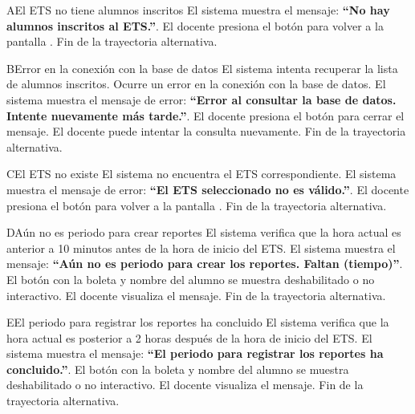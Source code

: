 \begin{UCtrayectoriaA}{A}{El ETS no tiene alumnos inscritos}
	\UCpaso El sistema muestra el mensaje: \textbf{ ``No hay alumnos inscritos al ETS.''}.
	\UCpaso[\UCactor] El docente presiona el botón  para volver a la pantalla .
	\UCpaso Fin de la trayectoria alternativa.
\end{UCtrayectoriaA}
\begin{UCtrayectoriaA}{B}{Error en la conexión con la base de datos}
	\UCpaso El sistema intenta recuperar la lista de alumnos inscritos.
	\UCpaso Ocurre un error en la conexión con la base de datos.
	\UCpaso El sistema muestra el mensaje de error: \textbf{ ``Error al consultar la base de datos. Intente nuevamente más tarde.''}.
	\UCpaso[\UCactor] El docente presiona el botón  para cerrar el mensaje.
	\UCpaso[\UCactor] El docente puede intentar la consulta nuevamente.
	\UCpaso Fin de la trayectoria alternativa.
\end{UCtrayectoriaA}
\begin{UCtrayectoriaA}{C}{El ETS no existe}
	\UCpaso El sistema no encuentra el ETS correspondiente.
	\UCpaso El sistema muestra el mensaje de error: \textbf{ ``El ETS seleccionado no es válido.''}.
	\UCpaso[\UCactor] El docente presiona el botón  para volver a la pantalla .
	\UCpaso Fin de la trayectoria alternativa.
\end{UCtrayectoriaA}
\begin{UCtrayectoriaA}{D}{Aún no es periodo para crear reportes}
	\UCpaso El sistema verifica que la hora actual es anterior a 10 minutos antes de la hora de inicio del ETS.
	\UCpaso El sistema muestra el mensaje: \textbf{ ``Aún no es periodo para crear los reportes. Faltan (tiempo)''}.
	\UCpaso El botón con la boleta y nombre del alumno se muestra deshabilitado o no interactivo.
	\UCpaso[\UCactor] El docente visualiza el mensaje.
	\UCpaso Fin de la trayectoria alternativa.
\end{UCtrayectoriaA}
\begin{UCtrayectoriaA}{E}{El periodo para registrar los reportes ha concluido}
	\UCpaso El sistema verifica que la hora actual es posterior a 2 horas después de la hora de inicio del ETS.
	\UCpaso El sistema muestra el mensaje: \textbf{ ``El periodo para registrar los reportes ha concluido.''}.
	\UCpaso El botón con la boleta y nombre del alumno se muestra deshabilitado o no interactivo.
	\UCpaso[\UCactor] El docente visualiza el mensaje.
	\UCpaso Fin de la trayectoria alternativa.
\end{UCtrayectoriaA}
